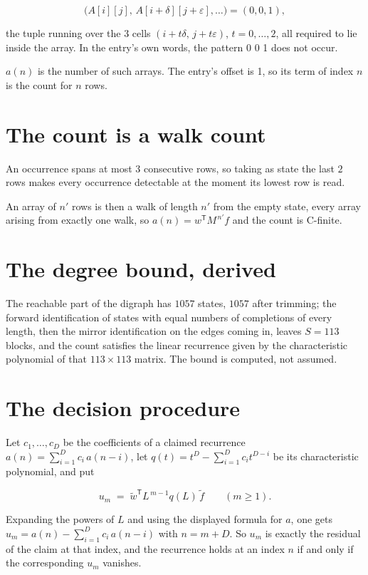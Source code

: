 \documentclass[11pt]{article}
\theoremstyle{definition}
\begin{document}
\[\bigl(A[i][j],\,A[i{+}\delta][j{+}\varepsilon],\dots\bigr) = (0, 0, 1),\]

the tuple running over the $3$ cells $(i+t\delta,\,j+t\varepsilon)$, $t = 0,\dots,2$, all required to lie inside the array. In the entry's own words, the pattern 0 0 1 does not occur.

$a(n)$ is the number of such arrays. The entry's offset is 1, so its term of index $n$ is the count for $n$ rows.

\section{The count is a walk count}

An occurrence spans at most $3$ consecutive rows, so taking as state the last $2$ rows makes every occurrence detectable at the moment its lowest row is read.

An array of $n'$ rows is then a walk of length $n'$ from the empty state, every array arising from exactly one walk, so $a(n) = w^{\mathsf T}M^{\,n'}f$ and the count is C-finite.

\section{The degree bound, derived}

The reachable part of the digraph has $1057$ states, $1057$ after trimming; the forward identification of states with equal numbers of completions of every length, then the mirror identification on the edges coming in, leaves $S = 113$ blocks, and the count satisfies the linear recurrence given by the characteristic polynomial of that $113\times113$ matrix. The bound is computed, not assumed.

\section{The decision procedure}

Let $c_1,\dots,c_D$ be the coefficients of a claimed recurrence $a(n) = \sum_{i=1}^{D} c_i\,a(n-i)$, let $q(t) = t^{D} - \sum_{i=1}^{D} c_i t^{D-i}$ be its characteristic polynomial, and put

\[u_m \;=\; \tilde w^{\mathsf T} L^{\,m-1} q(L)\,\tilde f \qquad (m \ge 1).\]

Expanding the powers of $L$ and using the displayed formula for $a$, one gets $u_m = a(n) - \sum_{i=1}^{D} c_i\,a(n-i)$ with $n = m + D$. So $u_m$ is exactly the residual of the claim at that index, and the recurrence holds at an index $n$ if and only if the corresponding $u_m$ vanishes.
\end{document}
